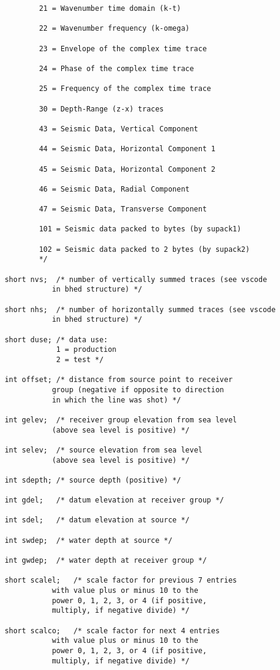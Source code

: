 {\begin{verbatim}
			21 = Wavenumber time domain (k-t)

			22 = Wavenumber frequency (k-omega)

			23 = Envelope of the complex time trace

			24 = Phase of the complex time trace

			25 = Frequency of the complex time trace

			30 = Depth-Range (z-x) traces

			43 = Seismic Data, Vertical Component 

			44 = Seismic Data, Horizontal Component 1 

			45 = Seismic Data, Horizontal Component 2 

			46 = Seismic Data, Radial Component

			47 = Seismic Data, Transverse Component  

			101 = Seismic data packed to bytes (by supack1)
			
			102 = Seismic data packed to 2 bytes (by supack2)
			*/

	short nvs;	/* number of vertically summed traces (see vscode
			   in bhed structure) */

	short nhs;	/* number of horizontally summed traces (see vscode
			   in bhed structure) */

	short duse;	/* data use:
				1 = production
				2 = test */

	int offset;	/* distance from source point to receiver
			   group (negative if opposite to direction
			   in which the line was shot) */

	int gelev;	/* receiver group elevation from sea level
			   (above sea level is positive) */

	int selev;	/* source elevation from sea level
			   (above sea level is positive) */

	int sdepth;	/* source depth (positive) */

	int gdel;	/* datum elevation at receiver group */

	int sdel;	/* datum elevation at source */

	int swdep;	/* water depth at source */

	int gwdep;	/* water depth at receiver group */

	short scalel;	/* scale factor for previous 7 entries
			   with value plus or minus 10 to the
			   power 0, 1, 2, 3, or 4 (if positive,
			   multiply, if negative divide) */

	short scalco;	/* scale factor for next 4 entries
			   with value plus or minus 10 to the
			   power 0, 1, 2, 3, or 4 (if positive,
			   multiply, if negative divide) */


\end{verbatim}}
